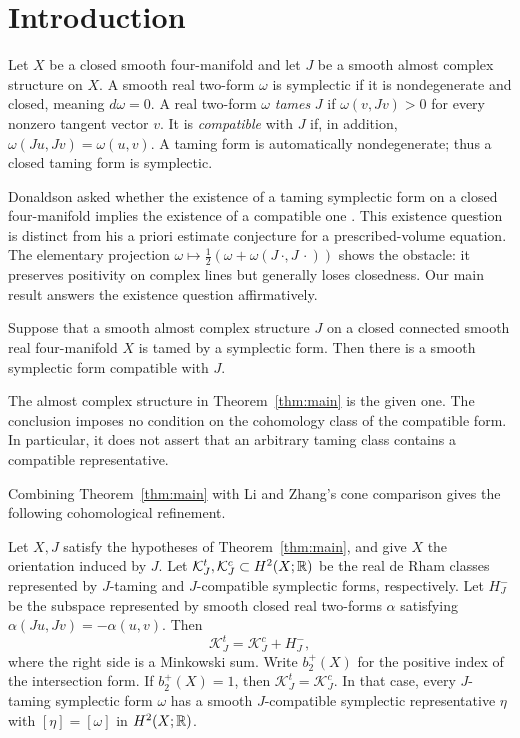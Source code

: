 \section{Introduction}

Let \(X\) be a closed smooth four-manifold and let \(J\) be a smooth
almost complex structure on \(X\). A smooth real two-form \(\omega\)
is symplectic if it is nondegenerate and closed, meaning
\(d\omega=0\). A real two-form \(\omega\)
\emph{tames} \(J\) if \(\omega(v,Jv)>0\) for every nonzero tangent
vector \(v\). It is \emph{compatible} with \(J\) if, in addition,
\(\omega(Ju,Jv)=\omega(u,v)\). A taming form is automatically
nondegenerate; thus a closed taming form is symplectic.

Donaldson asked whether the existence of a taming symplectic form
on a closed four-manifold implies the existence of a compatible
one \cite[Section~5.2, Question~2]{Donaldson2006}.
This existence question is distinct from his a priori estimate
conjecture for a prescribed-volume equation.
The elementary projection
\(\omega\mapsto \frac12(\omega+\omega(J\,\cdot,J\,\cdot))\)
shows the obstacle: it preserves positivity on complex lines
but generally loses closedness. Our main result answers the
existence question affirmatively.

\begin{theorem}\label{thm:main}
Suppose that a smooth almost complex structure \(J\) on a closed
connected smooth real four-manifold \(X\) is tamed by a symplectic
form. Then there is a smooth symplectic form compatible with \(J\).
\end{theorem}

The almost complex structure in Theorem~\ref{thm:main} is the given
one. The conclusion imposes no condition on the cohomology class of
the compatible form. In particular, it does not assert that an
arbitrary taming class contains a compatible representative.

Combining Theorem~\ref{thm:main} with Li and Zhang's cone comparison
gives the following cohomological refinement.

\begin{corollary}\label{cor:taming-cones}
Let \(X,J\) satisfy the hypotheses of Theorem~\ref{thm:main}, and give
\(X\) the orientation induced by \(J\). Let
\(\mathcal K_J^t,\mathcal K_J^c\subset H^2(X;\mathbb R)\) be the real de Rham
classes represented by \(J\)-taming and \(J\)-compatible symplectic
forms, respectively. Let \(H_J^-\) be the subspace represented by
smooth closed real two-forms \(\alpha\) satisfying
\(\alpha(Ju,Jv)=-\alpha(u,v)\). Then
\[
 \mathcal K_J^t=\mathcal K_J^c+H_J^-,
\]
where the right side is a Minkowski sum. Write \(b_2^+(X)\) for
the positive index of the intersection form. If \(b_2^+(X)=1\), then
\(\mathcal K_J^t=\mathcal K_J^c\). In that case, every \(J\)-taming
symplectic form \(\omega\) has a smooth \(J\)-compatible symplectic
representative \(\eta\) with \([\eta]=[\omega]\) in \(H^2(X;\mathbb R)\).
\end{corollary}

